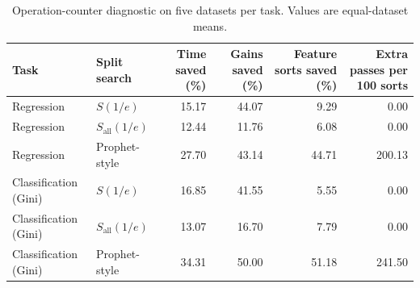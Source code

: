 \begin{table}[t]
\centering
\small
\caption{Operation-counter diagnostic on five datasets per task. Values are equal-dataset means.}
\label{tab:supp_runtime_diagnostic}
\begin{tabular}{llrrrr}
\toprule
Task & Split search & Time saved (\%) & Gains saved (\%) & Feature sorts saved (\%) & Extra passes per 100 sorts \\
\midrule
Regression & $S(1/e)$ & 15.17 & 44.07 & 9.29 & 0.00 \\
Regression & $S_{\mathrm{all}}(1/e)$ & 12.44 & 11.76 & 6.08 & 0.00 \\
Regression & Prophet-style & 27.70 & 43.14 & 44.71 & 200.13 \\
Classification (Gini) & $S(1/e)$ & 16.85 & 41.55 & 5.55 & 0.00 \\
Classification (Gini) & $S_{\mathrm{all}}(1/e)$ & 13.07 & 16.70 & 7.79 & 0.00 \\
Classification (Gini) & Prophet-style & 34.31 & 50.00 & 51.18 & 241.50 \\
\bottomrule
\end{tabular}
\end{table}
